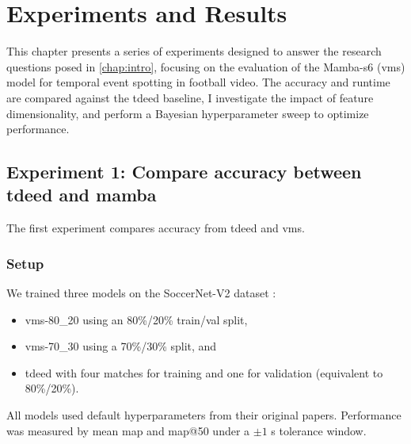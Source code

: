 \chapter{Experiments and Results}
\label{chap:experiments}
This chapter presents a series of experiments designed to answer the research questions posed in \autoref{chap:intro}, focusing on the evaluation of the Mamba-\acrshort{s6} (\acrshort{vms}) model for temporal event spotting in football video. The accuracy and runtime are compared against the \acrshort{tdeed} baseline, I investigate the impact of feature dimensionality, and perform a Bayesian hyperparameter sweep to optimize performance.


\section{Experiment 1: Compare accuracy between \acrshort{tdeed} and mamba}
\label{sec:experiment1}
The first experiment compares accuracy from \acrshort{tdeed} and \acrshort{vms}. 

\subsection{Setup}
\label{ssec:ex1_setup}
We trained three models on the SoccerNet-V2 dataset \cite{deliege_soccernet-v2_dataset_2021}:  
\begin{itemize}
    \item \acrshort{vms}-80\_20 using an 80\%/20\% train/val split,  
    \item \acrshort{vms}-70\_30 using a 70\%/30\% split, and  
    \item \acrshort{tdeed} with four matches for training and one for validation (equivalent to 80\%/20\%).  
\end{itemize}

All models used default hyperparameters from their original papers. Performance was measured by mean \acrfull{map} and \acrshort{map}@50 under a \(\pm 1\) s tolerance window.


